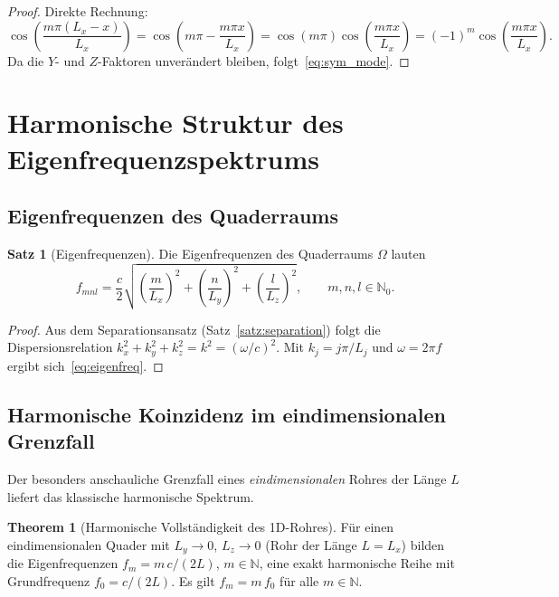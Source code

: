 ﻿\documentclass[12pt, a4paper]{article}
\theoremstyle{definition}
\newtheorem{satz}{Satz}[section]
\newtheorem{theorem}{Theorem}[section]
\theoremstyle{remark}
\newcommand{\N}{\mathbb{N}}
\newcommand{\Lx}{L_x}
\newcommand{\Ly}{L_y}
\newcommand{\Lz}{L_z}
\begin{document}
\begin{proof}
Direkte Rechnung:
\[
  \cos\!\left(\frac{m\pi(\Lx - x)}{\Lx}\right)
  = \cos\!\left(m\pi - \frac{m\pi x}{\Lx}\right)
  = \cos(m\pi)\cos\!\left(\frac{m\pi x}{\Lx}\right)
  = (-1)^m \cos\!\left(\frac{m\pi x}{\Lx}\right).
\]
Da die $Y$- und $Z$-Faktoren unverändert bleiben, folgt~\eqref{eq:sym_mode}. 
\end{proof}

\section{Harmonische Struktur des Eigenfrequenzspektrums}
\label{sec:harmonik}

\subsection{Eigenfrequenzen des Quaderraums}

\begin{satz}[Eigenfrequenzen]
\label{satz:eigenfreq}
Die Eigenfrequenzen des Quaderraums $\Omega$ lauten
\begin{equation}
  f_{mnl} = \frac{c}{2}\sqrt{\left(\frac{m}{\Lx}\right)^2
  + \left(\frac{n}{\Ly}\right)^2
  + \left(\frac{l}{\Lz}\right)^2},
  \qquad m,n,l \in \N_0.
  \label{eq:eigenfreq}
\end{equation}
\end{satz}

\begin{proof}
Aus dem Separationsansatz (Satz~\ref{satz:separation}) folgt die
Dispersionsrelation $k_x^2 + k_y^2 + k_z^2 = k^2 = (\omega/c)^2$.
Mit $k_j = j\pi/L_j$ und $\omega = 2\pi f$ ergibt sich~\eqref{eq:eigenfreq}. 
\end{proof}

\subsection{Harmonische Koinzidenz im eindimensionalen Grenzfall}

Der besonders anschauliche Grenzfall eines \emph{eindimensionalen} Rohres
der Länge $L$ liefert das klassische harmonische Spektrum.

\begin{theorem}[Harmonische Vollständigkeit des 1D-Rohres]
\label{thm:harmonie_1d}
Für einen eindimensionalen Quader mit $\Ly \to 0$, $\Lz \to 0$ (Rohr
der Länge $L = \Lx$) bilden die Eigenfrequenzen
$f_m = m\,c/(2L)$, $m \in \N$, eine exakt harmonische Reihe mit
Grundfrequenz $f_0 = c/(2L)$. Es gilt $f_m = m\,f_0$ für alle $m \in \N$.
\end{theorem}
\end{document}
